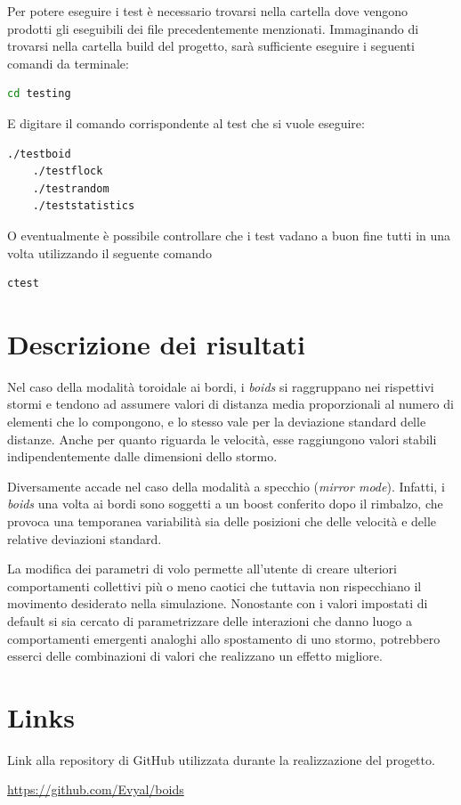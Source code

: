 \documentclass[10pt,a4paper]{article}
\begin{document}
Per potere eseguire i test è necessario trovarsi nella cartella dove vengono prodotti gli eseguibili dei file precedentemente menzionati. Immaginando di trovarsi nella cartella build del progetto, sarà sufficiente eseguire i seguenti comandi da terminale:

\begin{lstlisting}[style=codecolour, language=bash]
    cd testing
\end{lstlisting}

E digitare il comando corrispondente al test che si vuole eseguire: 

\begin{lstlisting}[style=codecolour, language=bash]
    ./testboid
    ./testflock
    ./testrandom
    ./teststatistics
\end{lstlisting}

O eventualmente è possibile controllare che i test vadano a buon fine tutti in una volta utilizzando il seguente comando

\begin{lstlisting}[style=codecolour, language=bash]
    ctest
\end{lstlisting}


\section{Descrizione dei risultati}

 Nel caso della modalità toroidale ai bordi, i \textit{boids} si raggruppano nei rispettivi stormi e tendono ad assumere valori di distanza media proporzionali al numero di elementi che lo compongono, e lo stesso vale per la deviazione standard delle distanze. Anche per quanto riguarda le velocità, esse raggiungono valori stabili indipendentemente dalle dimensioni dello stormo.

Diversamente accade nel caso della modalità a specchio (\textit{mirror mode}). Infatti, i \textit{boids} una volta ai bordi sono soggetti a un boost conferito dopo il rimbalzo, che provoca una temporanea variabilità sia delle posizioni che delle velocità e delle relative deviazioni standard.

La modifica dei parametri di volo permette all'utente di creare ulteriori comportamenti collettivi più o meno caotici che tuttavia non rispecchiano il movimento desiderato nella simulazione. Nonostante con i valori impostati di default si sia cercato di parametrizzare delle interazioni che danno luogo a comportamenti emergenti analoghi allo spostamento di uno stormo, potrebbero esserci delle combinazioni di valori che realizzano un effetto migliore. 

\section{Links}

\setlength{\parindent}{20pt}
Link alla repository di GitHub utilizzata durante la realizzazione del progetto.

\url{https://github.com/Evyal/boids}
\end{document}
